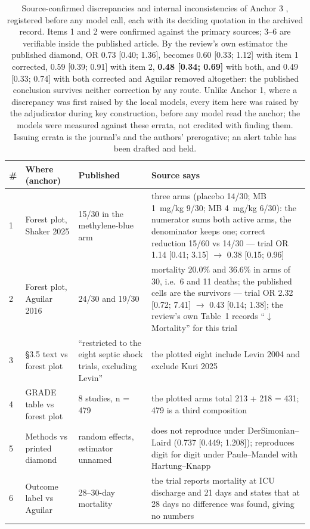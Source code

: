 \documentclass[11pt]{article}
\begin{document}
\begin{table}[H]
\centering\footnotesize
\caption{Source-confirmed discrepancies and internal inconsistencies of Anchor 3 \citep{rodriguezlima2026methylene}, registered before any model call, each with its deciding quotation in the archived record. Items 1 and 2 were confirmed against the primary sources; 3--6 are verifiable inside the published article. By the review's own estimator the published diamond, OR 0.73 [0.40; 1.36], becomes 0.60 [0.33; 1.12] with item 1 corrected, 0.59 [0.39; 0.91] with item 2, \textbf{0.48 [0.34; 0.69]} with both, and 0.49 [0.33; 0.74] with both corrected and Aguilar removed altogether: the published conclusion survives neither correction by any route. Unlike Anchor 1, where a discrepancy was first raised by the local models, every item here was raised by the adjudicator during key construction, before any model read the anchor; the models were measured against these errata, not credited with finding them. Issuing errata is the journal's and the authors' prerogative; an alert table has been drafted and held.}
\label{tab:errata3}
\begin{tabular}{@{}p{0.5cm}p{3.4cm}p{3.9cm}p{6.2cm}@{}}
\toprule
\# & Where (anchor) & Published & Source says \\
\midrule
1 & Forest plot, Shaker 2025 & 15/30 in the methylene-blue arm & three arms (placebo 14/30; MB 1~mg/kg 9/30; MB 4~mg/kg 6/30): the numerator sums both active arms, the denominator keeps one; correct reduction 15/60 vs 14/30 --- trial OR 1.14 [0.41; 3.15] $\rightarrow$ 0.38 [0.15; 0.96] \\
2 & Forest plot, Aguilar 2016 & 24/30 and 19/30 & mortality 20.0\% and 36.6\% in arms of 30, i.e.\ 6 and 11 deaths; the published cells are the survivors --- trial OR 2.32 [0.72; 7.41] $\rightarrow$ 0.43 [0.14; 1.38]; the review's own Table~1 records ``$\downarrow$ Mortality'' for this trial \\
3 & \S3.5 text vs forest plot & ``restricted to the eight septic shock trials, excluding Levin'' & the plotted eight include Levin 2004 and exclude Kuri 2025 \\
4 & GRADE table vs forest plot & 8 studies, n = 479 & the plotted arms total 213 + 218 = 431; 479 is a third composition \\
5 & Methods vs printed diamond & random effects, estimator unnamed & does not reproduce under DerSimonian--Laird (0.737 [0.449; 1.208]); reproduces digit for digit under Paule--Mandel with Hartung--Knapp \\
6 & Outcome label vs Aguilar & 28--30-day mortality & the trial reports mortality at ICU discharge and 21 days and states that at 28 days no difference was found, giving no numbers \\
\bottomrule
\end{tabular}
\end{table}
\end{document}
